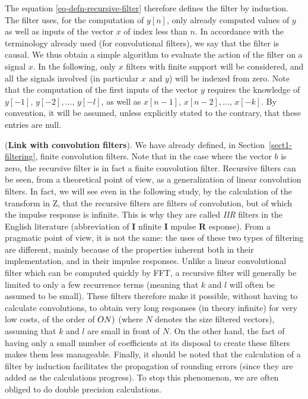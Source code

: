  
\begin{rem}
   The equation \eqref{eq-defn-recursive-filter} therefore defines the filter by induction. The filter uses, for the computation of $ y [n] $, only already computed values of $ y $ as well as inputs of the vector $ x $ of index less than $ n $. In accordance with the terminology already used (for convolutional filters), we say that the filter is causal. We thus obtain a simple algorithm to evaluate the action of the filter on a signal $ x $. In the following, only $ x $ filters with finite support will be considered, and all the signals involved (in particular $ x $ and $ y $) will be indexed from zero. Note that the computation of the first inputs of the vector $ y $ requires the knowledge of $ y [-1], \, y [-2], \ldots, \, y [-l] $, as well as $ x [n -1], \, x [n-2], \ldots, \, x [-k] $. By convention, it will be assumed, unless explicitly stated to the contrary, that these entries are null.
\end{rem}
 
 
\begin{rem}{(\upshape \textbf{Link with convolution filters}).} 
 We have already defined, in Section~\ref{sect1-filtering}, finite convolution filters. Note that in the case where the vector $ b $ is zero, the recursive filter is in fact a finite convolution filter. Recursive filters can be seen, from a theoretical point of view, as a generalization of linear convolution filters. In fact, we will see even in the following study, by the calculation of the transform in Z, that the recursive filters are filters of convolution, but of which the impulse response is infinite. This is why they are called \textit{IIR} filters in the English literature (abbreviation of \textbf{I} nfinite \textbf{I} mpulse \textbf{R} esponse). From a pragmatic point of view, it is not the same: the uses of these two types of filtering are different, mainly because of the properties inherent both in their implementation, and in their impulse responses. Unlike a linear convolutional filter which can be computed quickly by FFT, a recursive filter will generally be limited to only a few recurrence terms (meaning that $ k $ and $ l $ will often be assumed to be small). These filters therefore make it possible, without having to calculate convolutions, to obtain very long responses (in theory infinite) for very low costs, of the order of $ \grdo (N) $ (where $ N $ denotes the size filtered vectors), assuming that $ k $ and $ l $ are small in front of $ N $. On the other hand, the fact of having only a small number of coefficients at its disposal to create these filters makes them less manageable. Finally, it should be noted that the calculation of a filter by induction facilitates the propagation of rounding errors (since they are added as the calculations progress). To stop this phenomenon, we are often obliged to do double precision calculations.
\end{rem}
 
